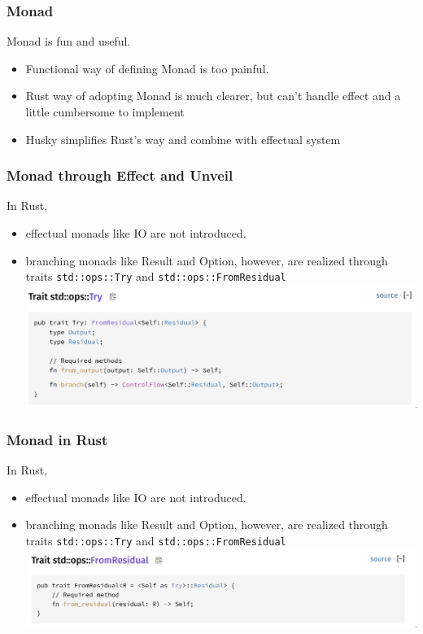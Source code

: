 \documentclass{beamer}   	%
\theoremstyle{definition}
\begin{document}
\begin{frame}
\frametitle{Monad}

Monad is fun and useful.
\begin{itemize}
	\item Functional way of defining Monad is too painful.
	\item Rust way of adopting Monad is much clearer, but can't handle effect and a little cumbersome to implement
	\item Husky simplifies Rust's way and combine with effectual system
\end{itemize}

\end{frame}

\begin{frame}
\frametitle{Monad through Effect and Unveil}
In Rust,
\begin{itemize}
	\item effectual monads like IO are not introduced.
	\item branching monads like Result and Option, however, are realized through traits \texttt{std::ops::Try} and \texttt{std::ops::FromResidual}
	\includegraphics[width=\linewidth]{snapshots/rust_std_ops_try.png}
\end{itemize}
\end{frame}

\begin{frame}
\frametitle{Monad in Rust}
In Rust,
\begin{itemize}
	\item effectual monads like IO are not introduced.
	\item branching monads like Result and Option, however, are realized through traits \texttt{std::ops::Try} and \texttt{std::ops::FromResidual}
	\includegraphics[width=\linewidth]{snapshots/rust_std_ops_from_residual.png} 
\end{itemize}
\end{frame}
\end{document}

